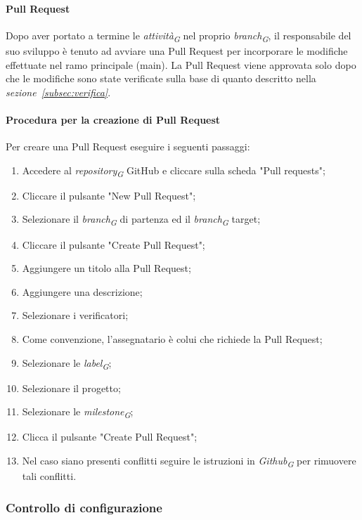 \paragraph{Pull Request}
Dopo aver portato a termine le \textit{attività}\textsubscript{\textit{G}} nel proprio \textit{branch}\textsubscript{\textit{G}}, il responsabile del suo sviluppo è tenuto ad avviare una Pull Request per incorporare le modifiche effettuate nel ramo principale (main). La Pull Request viene approvata solo dopo che le modifiche sono state verificate sulla base di quanto descritto nella \textit{sezione~\ref{subsec:verifica}}.

\hypertarget{par:creazionePR}{\paragraph*{Procedura per la creazione di Pull Request}}
Per creare una Pull Request eseguire i seguenti passaggi:
\begin{enumerate}
    \item Accedere al \textit{repository}\textsubscript{\textit{G}} GitHub e cliccare sulla scheda "Pull requests";
    \item Cliccare il pulsante "New Pull Request";
    \item Selezionare il \textit{branch}\textsubscript{\textit{G}} di partenza ed il \textit{branch}\textsubscript{\textit{G}} target;
    \item Cliccare il pulsante "Create Pull Request";
    \item Aggiungere un titolo alla Pull Request;
    \item Aggiungere una descrizione;
    \item Selezionare i verificatori;
    \item Come convenzione, l'assegnatario è colui che richiede la Pull Request;
    \item Selezionare le \textit{label}\textsubscript{\textit{G}};
    \item Selezionare il progetto;
    \item Selezionare le \textit{milestone}\textsubscript{\textit{G}};
    \item Clicca il pulsante "Create Pull Request";
    \item Nel caso siano presenti conflitti seguire le istruzioni in \textit{Github}\textsubscript{\textit{G}} per rimuovere tali conflitti.
\end{enumerate}

\subsubsection{Controllo di configurazione}
